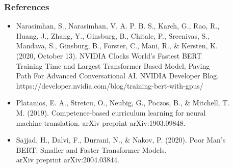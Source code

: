 \documentclass{beamer}
\begin{document}
\begin{frame}
	\frametitle{References}
	\begin{itemize}
		\item Narasimhan, S., Narasimhan, V. A. P. B. S., Karch, G., Rao, R., \\\hspace{1cm}Huang, J., Zhang, Y.,
		Ginsburg, B., Chitale, P., Sreenivas, S., \\\hspace{1cm}Mandava, S., Ginsburg, B., Forster, C., Mani,
		R., \& Kersten, K. \\\hspace{1cm}(2020, October 13). NVIDIA Clocks World’s Fastest BERT \\\hspace{1cm}Training
		Time and Largest Transformer Based Model, Paving \\\hspace{1cm}Path For Advanced
		Conversational AI. NVIDIA Developer Blog.
		\\\hspace{1cm}https://developer.nvidia.com/blog/training-bert-with-gpus/
		\item Platanios, E. A., Stretcu, O., Neubig, G., Poczos, B., \& Mitchell, T. \\\hspace{1cm}M. (2019).
		Competence-based curriculum learning for neural \\\hspace{1cm}machine translation. arXiv preprint
		arXiv:1903.09848.
		\item Sajjad, H., Dalvi, F., Durrani, N., \& Nakov, P. (2020). Poor Man's \\\hspace{1cm}BERT: Smaller and Faster
		Transformer Models. \\\hspace{1cm}arXiv preprint arXiv:2004.03844.
	\end{itemize}
\end{frame}
\end{document}
